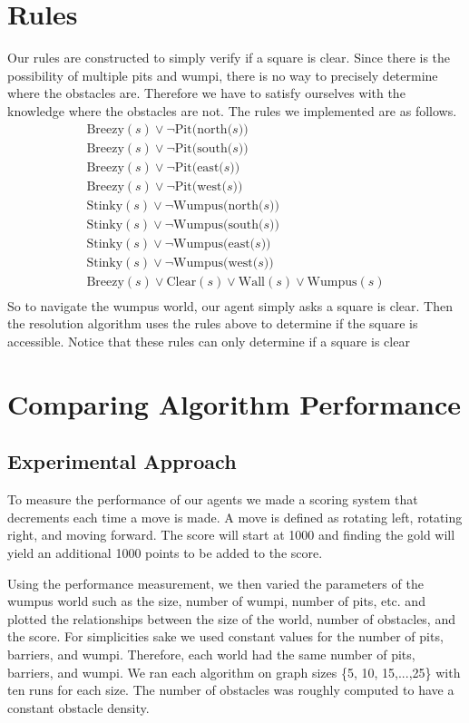 \documentclass{article}
\begin{document}
\section{Rules}

Our rules are constructed to simply verify if a square is clear. Since there is the possibility of multiple pits and wumpi, there is no way to precisely determine where the obstacles are. Therefore we have to satisfy ourselves with the knowledge where the obstacles are not. The rules we implemented are as follows.
\begin{gather*}
\text{Breezy}(s) \lor \neg \text{Pit(north($s$))} \\
\text{Breezy}(s) \lor \neg \text{Pit(south($s$))} \\
\text{Breezy}(s) \lor \neg \text{Pit(east($s$))} \\
\text{Breezy}(s) \lor \neg \text{Pit(west($s$))} \\
\text{Stinky}(s) \lor \neg \text{Wumpus(north($s$))} \\
\text{Stinky}(s) \lor \neg \text{Wumpus(south($s$))} \\
\text{Stinky}(s) \lor \neg \text{Wumpus(east($s$))} \\
\text{Stinky}(s) \lor \neg \text{Wumpus(west($s$))} \\
\text{Breezy}(s) \lor \text{Clear}(s) \lor \text{Wall}(s) \lor \text{Wumpus}(s)\\
\end{gather*}
So to navigate the wumpus world, our agent simply asks a square is clear. Then the resolution algorithm uses the rules above to determine if the square is accessible. Notice that these rules can only determine if a square is clear

\section{Comparing Algorithm Performance}
	\label{comparisons}
	
	\subsection{Experimental Approach}
	To measure the performance of our agents we made a scoring system that decrements each time a move is made.
	 A move is defined as rotating left, rotating right, and moving forward.
	  The score will start at 1000 and finding the gold will yield an additional 1000 points to be added to the score.
	
	Using the performance measurement, we then varied the parameters of the wumpus world such as the size, number of wumpi, number of pits, etc. and plotted the relationships between the size of the world, number of obstacles, and the score.
	 For simplicities sake we used constant values for the number of pits, barriers, and wumpi.
	  Therefore, each world had the same number of pits, barriers, and wumpi. 
	  We ran each algorithm on graph sizes \{5, 10, 15,...,25\} with ten runs for each size.
	  The number of obstacles was roughly computed to have a constant obstacle density.
	
\end{document}
